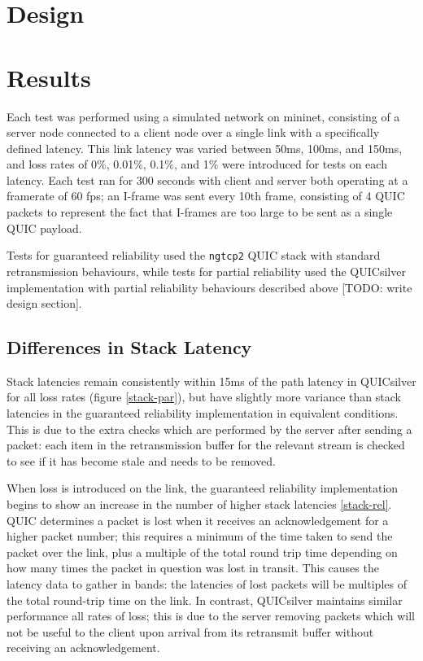 \documentclass{mpaper}
\begin{document}
\section{Design}




\section{Results}

Each test was performed using a simulated network on mininet, consisting of a server node connected to a client node over a single link with a specifically defined latency. This link latency was varied between 50ms, 100ms, and 150ms, and loss rates of 0\%, 0.01\%, 0.1\%, and 1\% were introduced for tests on each latency. Each test ran for 300 seconds with client and server both operating at a framerate of 60 fps; an I-frame was sent every 10th frame, consisting of 4 QUIC packets to represent the fact that I-frames are too large to be sent as a single QUIC payload.


Tests for guaranteed reliability used the \texttt{ngtcp2} QUIC stack with standard retransmission behaviours, while tests for partial reliability used the QUICsilver implementation with partial reliability behaviours described above [TODO: write design section].

\subsection{Differences in Stack Latency}

Stack latencies remain consistently within 15ms of the path latency in QUICsilver for all loss rates (figure \ref{stack-par}), but have slightly more variance than stack latencies in the guaranteed reliability implementation in equivalent conditions. This is due to the extra checks which are performed by the server after sending a packet: each item in the retransmission buffer for the relevant stream is checked to see if it has become stale and needs to be removed.


When loss is introduced on the link, the guaranteed reliability implementation begins to show an increase in the number of higher stack latencies \ref{stack-rel}. QUIC determines a packet is lost when it receives an acknowledgement for a higher packet number; this requires a minimum of the time taken to send the packet over the link, plus a multiple of the total round trip time depending on how many times the packet in question was lost in transit. This causes the latency data to gather in bands: the latencies of lost packets will be multiples of the total round-trip time on the link. In contrast, QUICsilver maintains similar performance all rates of loss; this is due to the server removing packets which will not be useful to the client upon arrival from its retransmit buffer without receiving an acknowledgement.
\end{document}
